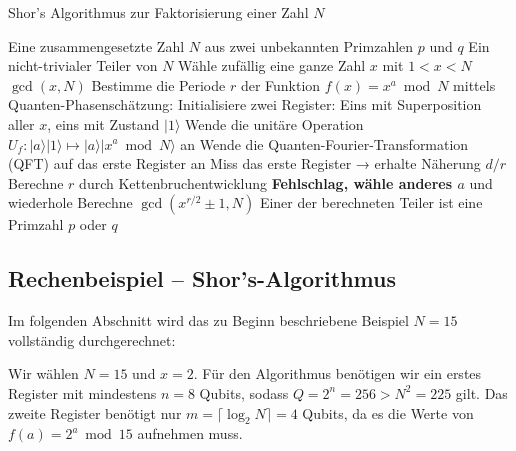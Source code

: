 \begin{algorithm}[H] %
\caption{Shor's Algorithmus zur Faktorisierung einer Zahl \( N \)}
\label{algorithm:shor}
\begin{algorithmic}[1]
\Require Eine zusammengesetzte Zahl \( N \) aus zwei unbekannten Primzahlen \( p \) und \( q \)
\Ensure Ein nicht-trivialer Teiler von \( N \)
\State Wähle zufällig eine ganze Zahl \( x \) mit \( 1 < x < N \)
    \State \Return \( \gcd(x, N) \) 
\EndIf
\State Bestimme die Periode \( r \) der Funktion \( f(x) = x^a \bmod N \) mittels Quanten-Phasenschätzung:
\State Initialisiere zwei Register: Eins mit Superposition aller \( x \), eins mit Zustand \( |1\rangle \)
\State Wende die unitäre Operation \( U_f \colon |a\rangle|1\rangle \mapsto |a\rangle|x^a \bmod N\rangle \) an
\State Wende die Quanten-Fourier-Transformation (QFT) auf das erste Register an
\State Miss das erste Register → erhalte Näherung \( d/r \)
\State Berechne \( r \) durch Kettenbruchentwicklung
    \State \Return \textbf{Fehlschlag, wähle anderes \( a \)} und wiederhole
\EndIf
\State Berechne \( \gcd(x^{r/2} \pm 1, N) \)
\State \Return Einer der berechneten Teiler ist eine Primzahl \( p \) oder \( q \)
\end{algorithmic}
\end{algorithm}

\subsection{Rechenbeispiel – Shor's-Algorithmus}

Im folgenden Abschnitt wird das zu Beginn beschriebene Beispiel \( N = 15 \) vollständig durchgerechnet:

Wir wählen \( N = 15 \) und \( x = 2 \). Für den Algorithmus benötigen wir ein erstes Register mit mindestens \( n = 8 \) Qubits, sodass \( Q = 2^n = 256 > N^2 = 225 \) gilt. Das zweite Register benötigt nur \( m = \lceil \log_2 N \rceil = 4 \) Qubits, da es die Werte von \( f(a) = 2^a \bmod 15 \) aufnehmen muss.

